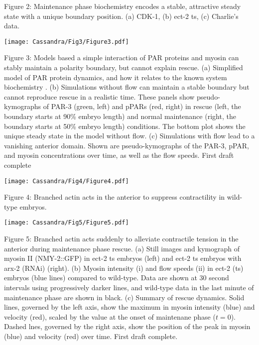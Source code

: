 \documentclass[11pt]{article}
\newcommand{\red}[1]{\color{red}#1\normalcolor}
\newcommand{\6}[1]{#1_{\text{6}}}
\newcommand{\3}[1]{#1_{\text{3}}}
\begin{document}
\newpage
Figure 2: Maintenance phase biochemistry encodes a stable, attractive steady state with a unique boundary position. (a) CDK-1, (b) ect-2 ts, (c) Charlie's data.

\newpage 
\begin{center}
\texttt{[image: Cassandra/Fig3/Figure3.pdf]}
\end{center}


\newpage
Figure 3: Models based a simple interaction of PAR proteins and myosin can stably maintain a polarity boundary, but cannot explain rescue. (a) Simplified model of PAR protein dynamics, and how it relates to the known system biochemistry \citep{lang2017proteins}. (b) Simulations without flow can maintain a stable boundary but cannot reproduce rescue in a realistic time. These panels show pseudo-kymographs of PAR-3 (green, left) and pPARs (red, right) in rescue (left, the boundary starts at 90\% embryo length) and normal maintenance (right, the boundary starts at 50\% embryo length) conditions. The bottom plot shows the unique steady state in the model without flow. (c) Simulations with flow lead to a vanishing anterior domain. Shown are pseudo-kymographs of the PAR-3, pPAR, and myosin concentrations over time, as well as the flow speeds. \red{First draft complete}

\newpage 
\begin{center}
\texttt{[image: Cassandra/Fig4/Figure4.pdf]}
\end{center}

\newpage 
Figure 4: Branched actin acts in the anterior to suppress contractility in wild-type embryos. 

\newpage 
\begin{center}
\texttt{[image: Cassandra/Fig5/Figure5.pdf]}
\end{center}

\newpage 
Figure 5: Branched actin acts suddenly to alleviate contractile tension in the anterior during maintenance phase rescue. (a) Still images and kymograph of myosin II (NMY-2::GFP) in ect-2 ts embryos (left) and ect-2 ts embryos with arx-2 (RNAi) (right). (b) Myosin intensity (i) and flow speeds (ii) in ect-2 (ts) embryos (blue lines) compared to wild-type. Data are shown at 30 second intervals using progressively darker lines, and wild-type data in the last minute of maintenance phase are shown in black. (c) Summary of rescue dynamics. Solid lines, governed by the left axis, show the maximum in myosin intensity (blue) and velocity (red), scaled by the value at the onset of maintenane phase ($t=0$). Dashed lnes, governed by the right axis, show the position of the peak in myosin (blue) and velocity (red) over time.  \red{First draft complete.}
\end{document}
